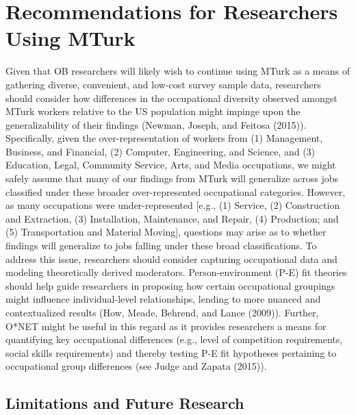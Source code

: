 \documentclass[english,man]{apa6}
\theoremstyle{definition}
\theoremstyle{definition}
\theoremstyle{remark}
\begin{document}
\section{Recommendations for Researchers Using
MTurk}\label{recommendations-for-researchers-using-mturk}

Given that OB researchers will likely wish to continue using MTurk as a
means of gathering diverse, convenient, and low-cost survey sample data,
researchers should consider how differences in the occupational
diversity observed amongst MTurk workers relative to the US population
might impinge upon the generalizability of their findings (Newman,
Joseph, and Feitosa (2015)). Specifically, given the over-representation
of workers from (1) Management, Business, and Financial, (2) Computer,
Engineering, and Science, and (3) Education, Legal, Community Service,
Arts, and Media occupations, we might safely assume that many of our
findings from MTurk will generalize across jobs classified under these
broader over-represented occupational categories. However, as many
occupations were under-represented {[}e.g., (1) Service, (2)
Construction and Extraction, (3) Installation, Maintenance, and Repair,
(4) Production; and (5) Transportation and Material Moving{]}, questions
may arise as to whether findings will generalize to jobs falling under
these broad classifications. To address this issue, researchers should
consider capturing occupational data and modeling theoretically derived
moderators. Person-environment (P-E) fit theories should help guide
researchers in proposing how certain occupational groupings might
influence individual-level relationships, lending to more nuanced and
contextualized results (How, Meade, Behrend, and Lance (2009)). Further,
O*NET might be useful in this regard as it provides researchers a means
for quantifying key occupational differences (e.g., level of competition
requirements, social skills requirements) and thereby testing P-E fit
hypotheses pertaining to occupational group differences (see Judge and
Zapata (2015)).

\subsection{Limitations and Future
Research}\label{limitations-and-future-research}
\end{document}
